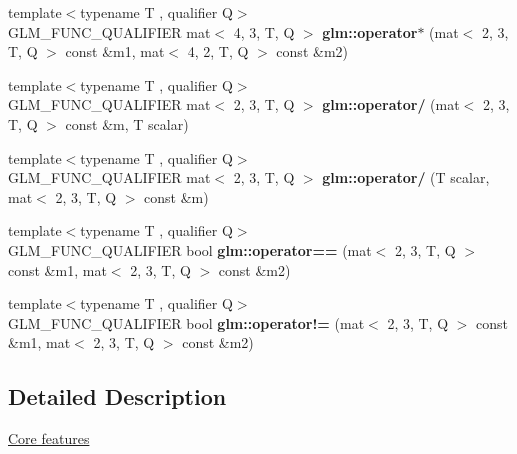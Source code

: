 \begin{DoxyCompactItemize}
\item 
\mbox{\label{type__mat2x3_8inl_aba644df17324a552b9bd3d25e5a169f1}} 
{\footnotesize template$<$typename T , qualifier Q$>$ }\\G\+L\+M\+\_\+\+F\+U\+N\+C\+\_\+\+Q\+U\+A\+L\+I\+F\+I\+ER mat$<$ 4, 3, T, Q $>$ {\bfseries glm\+::operator$\ast$} (mat$<$ 2, 3, T, Q $>$ const \&m1, mat$<$ 4, 2, T, Q $>$ const \&m2)
\item 
\mbox{\label{type__mat2x3_8inl_a62fc516152818f35e959b394c9297864}} 
{\footnotesize template$<$typename T , qualifier Q$>$ }\\G\+L\+M\+\_\+\+F\+U\+N\+C\+\_\+\+Q\+U\+A\+L\+I\+F\+I\+ER mat$<$ 2, 3, T, Q $>$ {\bfseries glm\+::operator/} (mat$<$ 2, 3, T, Q $>$ const \&m, T scalar)
\item 
\mbox{\label{type__mat2x3_8inl_af62343be126a185c3a6dbdff2ce7bfd9}} 
{\footnotesize template$<$typename T , qualifier Q$>$ }\\G\+L\+M\+\_\+\+F\+U\+N\+C\+\_\+\+Q\+U\+A\+L\+I\+F\+I\+ER mat$<$ 2, 3, T, Q $>$ {\bfseries glm\+::operator/} (T scalar, mat$<$ 2, 3, T, Q $>$ const \&m)
\item 
\mbox{\label{type__mat2x3_8inl_a9a15bd4cbb2a061f9db872d89f613cbb}} 
{\footnotesize template$<$typename T , qualifier Q$>$ }\\G\+L\+M\+\_\+\+F\+U\+N\+C\+\_\+\+Q\+U\+A\+L\+I\+F\+I\+ER bool {\bfseries glm\+::operator==} (mat$<$ 2, 3, T, Q $>$ const \&m1, mat$<$ 2, 3, T, Q $>$ const \&m2)
\item 
\mbox{\label{type__mat2x3_8inl_aca6f585570373276e3ed772847def9c5}} 
{\footnotesize template$<$typename T , qualifier Q$>$ }\\G\+L\+M\+\_\+\+F\+U\+N\+C\+\_\+\+Q\+U\+A\+L\+I\+F\+I\+ER bool {\bfseries glm\+::operator!=} (mat$<$ 2, 3, T, Q $>$ const \&m1, mat$<$ 2, 3, T, Q $>$ const \&m2)
\end{DoxyCompactItemize}


\subsection{Detailed Description}
\hyperlink{group__core}{Core features} 